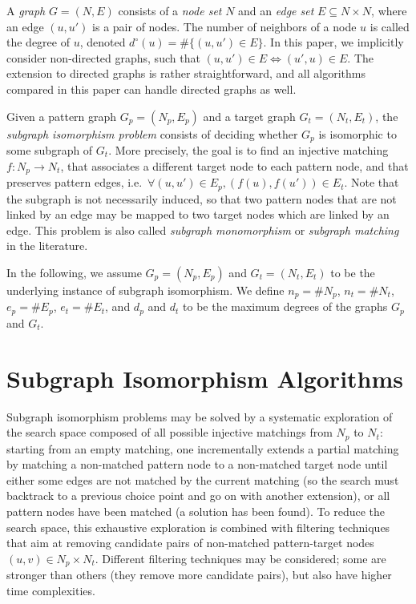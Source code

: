 \documentclass{llncs}
\begin{document}
A \emph{graph} $G=(N,E)$ consists of a \emph{node set} $N$ and an \emph{edge set} $E \subseteq N
\times N$, where an edge $(u,u')$ is a pair of nodes. The number of neighbors of a node $u$ is
called the degree of $u$, denoted $d^\circ(u)=\#\{ (u,u')\in E\}$. In this paper, we implicitly consider
non-directed graphs, such that $(u,u')\in E\Leftrightarrow (u',u)\in E$. The extension to directed
graphs is rather straightforward, and all algorithms compared in this paper can handle directed
graphs as well.

Given a pattern graph $G_p=(N_p,E_p)$ and a target graph $G_t=(N_t,E_t)$, the \emph{subgraph
isomorphism problem} consists of deciding whether $G_p$ is isomorphic to some subgraph of $G_t$.
More precisely, the goal is to find an injective matching $f: N_p\rightarrow N_t$, that associates a
different target node to each pattern node, and that preserves pattern edges, i.e.\ $\forall (u,u')
\in E_p, (f(u),f(u')) \in E_t$.
Note that the subgraph is not necessarily induced, so that two pattern nodes that are not linked by
an edge may be mapped to two target nodes which are linked by an edge. This problem is also called
\emph{subgraph monomorphism} or \emph{subgraph matching} in the literature.

In the following, we assume $G_p=(N_p,E_p)$ and $G_t=(N_t,E_t)$ to be the underlying instance of 
subgraph isomorphism.  We  define $n_p = \# N_p$, $n_t = \# N_t$,  $e_p=\# E_p$, $e_t=\#
E_t$, and $d_p$ and $d_t$ to be the maximum degrees of the graphs $G_p$ and $G_t$.

\section{Subgraph Isomorphism Algorithms}\label{sec:algs}

Subgraph isomorphism problems may be solved by a systematic exploration of the search space composed
of all possible injective matchings from $N_p$ to $N_t$: starting from an empty matching, one
incrementally extends a partial matching by matching a non-matched pattern node to a non-matched
target node until either some edges are not matched by the current matching (so the search must
backtrack to a previous choice point and go on with another extension), or all pattern nodes have
been matched (a solution has been found). To reduce the search space, this exhaustive exploration is
combined with filtering techniques that aim at removing candidate pairs of non-matched
pattern-target nodes $(u,v)\in N_p\times N_t$. Different filtering techniques may be considered;
some are stronger than others (they remove more candidate pairs), but also have higher time
complexities.
\end{document}
